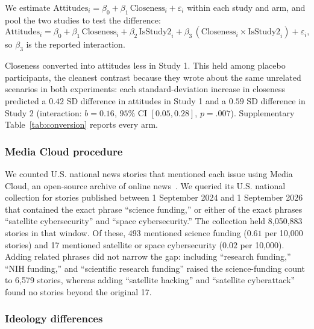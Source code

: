 \documentclass[11pt]{article}
\begin{document}
We estimate $\text{Attitudes}_i = \beta_0 + \beta_1\,\text{Closeness}_i + \varepsilon_i$ within each study and arm, and pool the two studies to test the difference:
\begin{equation*}
\text{Attitudes}_i = \beta_0 + \beta_1\,\text{Closeness}_i + \beta_2\,\text{IsStudy2}_i
+ \beta_3\,(\text{Closeness}_i \times \text{IsStudy2}_i) + \varepsilon_i,
\end{equation*}
so $\beta_3$ is the reported interaction.

Closeness converted into attitudes less in Study 1. This held among placebo participants, the cleanest contrast because they wrote about the same unrelated scenarios in both experiments: each standard-deviation increase in closeness predicted a $0.42$ SD difference in attitudes in Study 1 and a $0.59$ SD difference in Study 2 (interaction: $b=0.16$, $95\%$ CI $[0.05, 0.28]$, $p=.007$). Supplementary Table~\ref{tab:conversion} reports every arm.


{\footnotesize

}

\subsubsection{Media Cloud procedure}
\label{sec:si-media-cloud}

We counted U.S. national news stories that mentioned each issue using Media Cloud, an open-source archive of online news~\citep{roberts_media_2021}. We queried its U.S. national collection for stories published between 1 September 2024 and 1 September 2026 that contained the exact phrase ``science funding,'' or either of the exact phrases ``satellite cybersecurity'' and ``space cybersecurity.'' The collection held 8,050,883 stories in that window. Of these, 493 mentioned science funding ($0.61$ per 10,000 stories) and 17 mentioned satellite or space cybersecurity ($0.02$ per 10,000). Adding related phrases did not narrow the gap: including ``research funding,'' ``NIH funding,'' and ``scientific research funding'' raised the science-funding count to 6,579 stories, whereas adding ``satellite hacking'' and ``satellite cyberattack'' found no stories beyond the original 17.

\subsubsection{Ideology differences}
\label{sec:si-ideology-differences}
\end{document}
